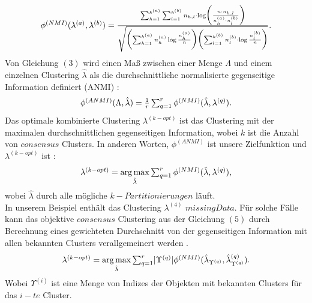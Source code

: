 \documentclass[runningheads]{llncs}
\begin{document}
\begin{equation}
\centerline{$\phi^{(NMI)}(\lambda^{(a)}, \lambda^{(b)}) = \frac{\sum_{h=1}^{k^{(a)}} \sum_{l=1}^{k^{(b)}}n_{h,l} \cdot \log \biggl(\frac{n \cdot n_{h,l}}{n_{h}^{(a)} \cdot n_{l}^{(b)}} \biggr) }{\sqrt{\biggl(\sum_{h=1}^{k^{(a)}} n_{h}^{(a)} \log \frac{n_{h}^{(a)}}{n} \biggr)
			\biggl(\sum_{l=1}^{k^{(b)}} n_{l}^{(b)} \cdot \log \frac{n_{l}^{(b)}}{n} \biggr)}}.$}
\end{equation}
Von Gleichung $(3)$ wird einen Maß zwischen einer Menge $\Lambda$ und einem einzelnen Clustering $\hat{\lambda}$  als die durchschnittliche normalisierte gegenseitige Information definiert (ANMI) \cite{strehl2002cluster}: 
\begin{equation} 
	\centerline{$\phi^{(ANMI)}(\Lambda, \hat{\lambda}) = \frac{1}{r} \sum_{q=1}^{r} \phi^{(NMI)}(\hat{\lambda}, \lambda^{(q)}).$}
\end{equation}
Das optimale kombinierte Clustering $\lambda^{(k-opt)}$ ist das Clustering mit der maximalen durchschnittlichen gegenseitigen Information, wobei $k$ ist die Anzahl von $consensus$ Clusters. In anderen Worten, $\phi^{(ANMI)}$ ist unsere Zielfunktion und $\lambda^{(k-opt)}$ ist \cite{strehl2002cluster}:
\begin{equation} 
	\centerline{$\lambda^{(k-opt)} = \underset{\hat{\lambda}}{\arg\max} \sum_{q=1}^{r} \phi^{(NMI)}(\hat{\lambda}, \lambda^{(q)}),$}
\end{equation}
wobei $\hat{\lambda}$ durch alle mögliche $k-Partitionierungen$ läuft. \\  
In unserem Beispiel enthält das Clustering $\lambda^{(4)}$ $missing Data$. Für solche Fälle kann das objektive $consensus$ Clustering aus der Gleichung $(5)$ durch Berechnung eines gewichteten Durchschnitt von der gegenseitigen Information mit allen bekannten Clusters verallgemeinert werden \cite{strehl2002cluster}.   
\begin{equation} 
	\centerline{$\lambda^{(k-opt)} = \underset{\hat{\lambda}}{\arg\max} \sum_{q=1}^{r} \lvert \Upsilon^{(q)} \lvert \phi^{(NMI)}(\hat{\lambda}_{\Upsilon^{(q)}}, \hat{\lambda}_{\Upsilon^{(q)}}^{(q)}).$}
\end{equation}
Wobei $\Upsilon^{(i)}$ ist eine Menge von Indizes der Objekten mit bekannten Clusters für das $i-te$ Cluster. 
\end{document}

